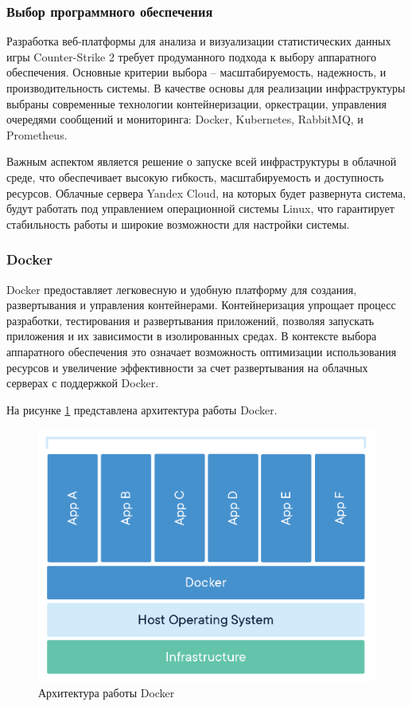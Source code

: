 \subsubsection{Выбор программного обеспечения}

Разработка веб-платформы для анализа и визуализации статистических данных игры Counter-Strike 2 требует продуманного подхода к выбору аппаратного обеспечения. Основные критерии выбора – масштабируемость, надежность, и производительность системы. В качестве основы для реализации инфраструктуры выбраны современные технологии контейнеризации, оркестрации, управления очередями сообщений и мониторинга: Docker, Kubernetes, RabbitMQ, и Prometheus.

Важным аспектом является решение о запуске всей инфраструктуры в облачной среде, что обеспечивает высокую гибкость, масштабируемость и доступность ресурсов. Облачные сервера Yandex Cloud, на которых будет развернута система, будут работать под управлением операционной системы Linux, что гарантирует стабильность работы и широкие возможности для настройки системы.

\subsubsection{Docker}

Docker предоставляет легковесную и удобную платформу для создания, развертывания и управления контейнерами. Контейнеризация упрощает процесс разработки, тестирования и развертывания приложений, позволяя запускать приложения и их зависимости в изолированных средах. В контексте выбора аппаратного обеспечения это означает возможность оптимизации использования ресурсов и увеличение эффективности за счет развертывания на облачных серверах с поддержкой Docker.

На рисунке \ref{fig:-Docker} представлена архитектура работы Docker.
\begin{figure}
	\centering
	\includegraphics[width=0.9\linewidth]{"images/Docker"}
	\caption{Архитектура работы Docker}
	\label{fig:-Docker}
\end{figure}

